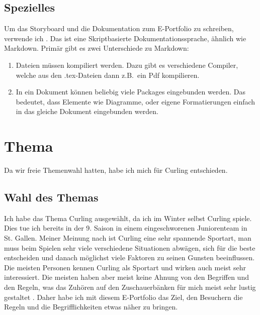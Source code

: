\documentclass[11pt]{article}
\begin{document}
    \subsection{Spezielles}
    Um das Storyboard und die Dokumentation zum E-Portfolio zu schreiben, verwende ich \latex. Das ist
    eine Skriptbasierte Dokumentationssprache, ähnlich wie Markdown. Primär gibt es zwei Unterschiede zu
    Markdown:
    \begin{enumerate}
        \item \latex Dateien müssen kompiliert werden. Dazu gibt es verschiedene Compiler, welche aus den
        .tex-Dateien dann z.B.\ ein Pdf kompilieren.
        \item In ein \latex Dokument können beliebig viele Packages eingebunden werden. Das bedeutet, dass
        Elemente wie Diagramme, oder eigene Formatierungen einfach in das gleiche Dokument eingebunden werden.
    \end{enumerate}

    \pagebreak
    \section{Thema}

    Da wir freie Themenwahl hatten, habe ich mich für Curling entschieden.

    \subsection{Wahl des Themas}

    Ich habe das Thema Curling ausgewählt, da ich im Winter selbst Curling spiele. Dies tue ich bereits in der
    9. Saison in einem eingeschworenen Juniorenteam in St. Gallen.
    Meiner Meinung nach ist Curling eine sehr spannende Sportart, man muss beim Spielen sehr viele verschiedene
    Situationen abwägen, sich für die beste entscheiden und danach möglichst viele Faktoren zu seinen Gunsten
    beeinflussen. \\
    Die meisten Personen kennen Curling als Sportart und wirken auch meist sehr interessiert. Die meisten haben
    aber meist keine Ahnung von den Begriffen und den Regeln, was das Zuhören auf den Zuschauerbänken für mich
    meist sehr lustig gestaltet \smiley. Daher habe ich mit diesem E-Portfolio das Ziel, den Besuchern
    die Regeln und die Begrifflichkeiten etwas näher zu bringen.

\end{document}
